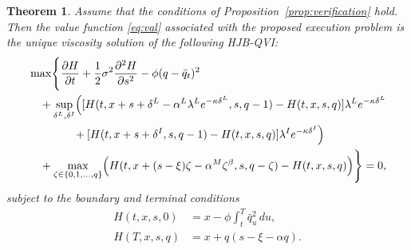 \documentclass[12pt]{article}
\newtheorem{theorem}[thm]{Theorem}
\begin{document}
\begin{theorem}
\label{thm:hjbqvi_execution}
Assume that the conditions of Proposition~\ref{prop:verification} hold.
Then the value function \eqref{eq:val} associated with the proposed execution problem is the unique viscosity solution of the following HJB-QVI:
\begin{align}
&\max\Biggl\{
\frac{\partial H}{\partial t}
+
\frac{1}{2}\sigma^2
\frac{\partial^2H}{\partial s^2}
-
\phi(q-\bar q_t)^2
\nonumber\\
&\quad+
\sup_{\delta^L,\delta^I}
\Bigl(
[H(t,x+s+\delta^L-\alpha^L\lambda^L e^{-\kappa\delta^L},s,q-1)
-
H(t,x,s,q)]
\lambda^L e^{-\kappa\delta^L}
\nonumber\\
&\qquad\qquad+
[H(t,x+s+\delta^I,s,q-1)
-
H(t,x,s,q)]
\lambda^I e^{-\kappa\delta^I}
\Bigr)
\nonumber\\
&\quad+
\max_{\zeta\in\{0,1,\ldots,q\}}
\Bigl(
H(t,x+(s-\xi)\zeta-\alpha^M\zeta^\beta,s,q-\zeta)
-
H(t,x,s,q)
\Bigr)
\Biggr\}
=
0,
\label{eq:HJBQVI2}
\end{align}
subject to the boundary and terminal conditions
\begin{align*}
H(t,x,s,0)
&=
x
-
\phi
\int_t^T
\bar q_u^2\,du,
\\
H(T,x,s,q)
&=
x+q(s-\xi-\alpha q).
\end{align*}
\end{theorem}
\end{document}
